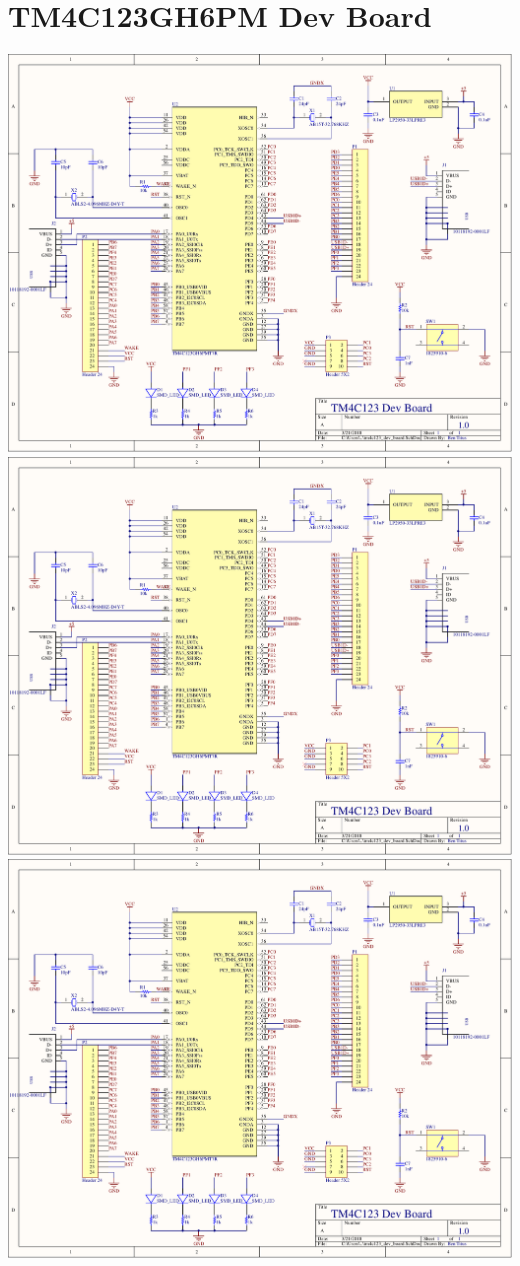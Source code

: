 \section{TM4C123GH6PM Dev Board}
\label{app:tm4c_dev_board}
\centering
\includegraphics[page=1,width=\textwidth,angle=270]{PDFs/tm4c123_dev_board.PDF} \newpage
\includegraphics[page=2,width=\textwidth,angle=270]{PDFs/tm4c123_dev_board.PDF} \newpage
\includegraphics[page=3,width=\textwidth,angle=270]{PDFs/tm4c123_dev_board.PDF} \newpage